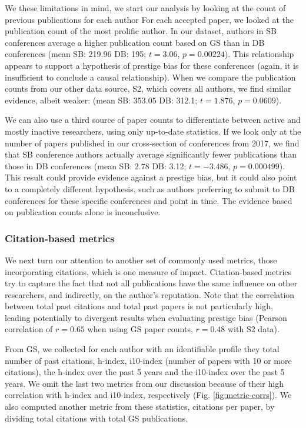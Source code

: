 \documentclass[12pt]{article}
\begin{document}
We these limitations in mind, we start our analysis by looking at the count of previous publications for each author
For each accepted paper, we looked at the publication count of the most prolific author.
In our dataset, authors in SB conferences average a higher publication count based on GS than in DB conferences
(mean SB: 219.96 DB: 195; \(t=3.06\), \(p=0.00224\)).
This relationship appears to support a hypothesis of prestige bias for these conferences (again, it is insufficient to conclude a causal relationship).
When we compare the publication counts from our other data source, S2, which covers all authors, we find similar evidence, albeit weaker:
(mean SB: 353.05 DB: 312.1; \(t=1.876\), \(p=0.0609\)).

We can also use a third source of paper counts to differentiate between active and mostly inactive researchers, using only up-to-date statistics.
If we look only at the number of papers published in our cross-section of conferences from 2017, we find that SB conference authors actually average significantly fewer publications than those in DB conferences
(mean SB: 2.78 DB: 3.12; \(t=-3.486\), \(p=0.000499\)).
This result could provide evidence against a prestige bias, but it could also point to a completely different hypothesis, such as authors preferring to submit to DB conferences for these specific conferences and point in time.
The evidence based on publication counts alone is inconclusive.

\hypertarget{citation-based-metrics}{%
\subsubsection{Citation-based metrics}\label{citation-based-metrics}}

We next turn our attention to another set of commonly used metrics, those incorporating citations, which is one measure of impact.
Citation-based metrics try to capture the fact that not all publications have the same influence on other researchers, and indirectly, on the author's reputation.
Note that the correlation between total past citations and total past papers is not particularly high, leading potentially to divergent results when evaluating prestige bias
(Pearson correlation of
\(r=0.65\)
when using GS paper counts,
\(r=0.48\)
with S2 data).

From GS, we collected for each author with an identifiable profile they total number of past citations, h-index, i10-index (number of papers with 10 or more citations), the h-index over the past 5 years and the i10-index over the past 5 years.
We omit the last two metrics from our discussion because of their high correlation with h-index and i10-index, respectively (Fig. \ref{fig:metric-corrs}).
We also computed another metric from these statistics, citations per paper, by dividing total citations with total GS publications.
\end{document}

